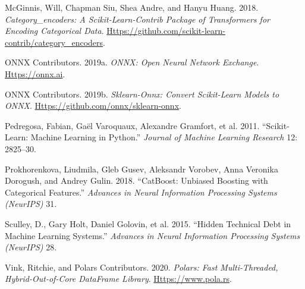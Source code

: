 \documentclass[
]{article}
\newlength{\cslhangindent}
\newenvironment{CSLReferences}[2] %
 {\begin{list}{}{%
  \setlength{\itemindent}{0pt}
  \setlength{\leftmargin}{0pt}
  \setlength{\parsep}{0pt}
  \ifodd #1
   \setlength{\leftmargin}{\cslhangindent}
   \setlength{\itemindent}{-1\cslhangindent}
  \fi
  \setlength{\itemsep}{#2\baselineskip}}}
 {\end{list}}
\begin{document}
\begin{CSLReferences}{1}{1}
McGinnis, Will, Chapman Siu, Shea Andre, and Hanyu Huang. 2018.
\emph{Category\_encoders: A Scikit-Learn-Contrib Package of Transformers
for Encoding Categorical Data}.
\href{https://github.com/scikit-learn-contrib/category_encoders}{Https://github.com/scikit-learn-contrib/category\_encoders}.

ONNX Contributors. 2019a. \emph{{ONNX}: Open Neural Network Exchange}.
\href{https://onnx.ai}{Https://onnx.ai}.

ONNX Contributors. 2019b. \emph{Sklearn-Onnx: Convert Scikit-Learn
Models to {ONNX}}.
\href{https://github.com/onnx/sklearn-onnx}{Https://github.com/onnx/sklearn-onnx}.

Pedregosa, Fabian, Gaël Varoquaux, Alexandre Gramfort, et al. 2011.
{``Scikit-Learn: Machine Learning in {P}ython.''} \emph{Journal of
Machine Learning Research} 12: 2825--30.

Prokhorenkova, Liudmila, Gleb Gusev, Aleksandr Vorobev, Anna Veronika
Dorogush, and Andrey Gulin. 2018. {``{CatBoost}: Unbiased Boosting with
Categorical Features.''} \emph{Advances in Neural Information Processing
Systems (NeurIPS)} 31.

Sculley, D., Gary Holt, Daniel Golovin, et al. 2015. {``Hidden Technical
Debt in Machine Learning Systems.''} \emph{Advances in Neural
Information Processing Systems (NeurIPS)} 28.

Vink, Ritchie, and Polars Contributors. 2020. \emph{Polars: Fast
Multi-Threaded, Hybrid-Out-of-Core {D}ata{F}rame Library}.
\href{https://www.pola.rs}{Https://www.pola.rs}.

\end{CSLReferences}
\end{document}
